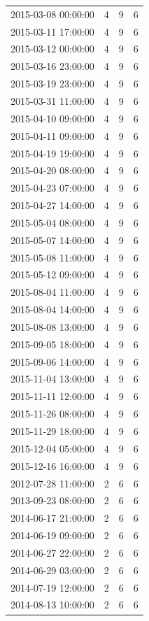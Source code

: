 \begin{tabular}{lrrr}
2015-03-08 00:00:00 & 4 & 9 & 6 \\
2015-03-11 17:00:00 & 4 & 9 & 6 \\
2015-03-12 00:00:00 & 4 & 9 & 6 \\
2015-03-16 23:00:00 & 4 & 9 & 6 \\
2015-03-19 23:00:00 & 4 & 9 & 6 \\
2015-03-31 11:00:00 & 4 & 9 & 6 \\
2015-04-10 09:00:00 & 4 & 9 & 6 \\
2015-04-11 09:00:00 & 4 & 9 & 6 \\
2015-04-19 19:00:00 & 4 & 9 & 6 \\
2015-04-20 08:00:00 & 4 & 9 & 6 \\
2015-04-23 07:00:00 & 4 & 9 & 6 \\
2015-04-27 14:00:00 & 4 & 9 & 6 \\
2015-05-04 08:00:00 & 4 & 9 & 6 \\
2015-05-07 14:00:00 & 4 & 9 & 6 \\
2015-05-08 11:00:00 & 4 & 9 & 6 \\
2015-05-12 09:00:00 & 4 & 9 & 6 \\
2015-08-04 11:00:00 & 4 & 9 & 6 \\
2015-08-04 14:00:00 & 4 & 9 & 6 \\
2015-08-08 13:00:00 & 4 & 9 & 6 \\
2015-09-05 18:00:00 & 4 & 9 & 6 \\
2015-09-06 14:00:00 & 4 & 9 & 6 \\
2015-11-04 13:00:00 & 4 & 9 & 6 \\
2015-11-11 12:00:00 & 4 & 9 & 6 \\
2015-11-26 08:00:00 & 4 & 9 & 6 \\
2015-11-29 18:00:00 & 4 & 9 & 6 \\
2015-12-04 05:00:00 & 4 & 9 & 6 \\
2015-12-16 16:00:00 & 4 & 9 & 6 \\
2012-07-28 11:00:00 & 2 & 6 & 6 \\
2013-09-23 08:00:00 & 2 & 6 & 6 \\
2014-06-17 21:00:00 & 2 & 6 & 6 \\
2014-06-19 09:00:00 & 2 & 6 & 6 \\
2014-06-27 22:00:00 & 2 & 6 & 6 \\
2014-06-29 03:00:00 & 2 & 6 & 6 \\
2014-07-19 12:00:00 & 2 & 6 & 6 \\
2014-08-13 10:00:00 & 2 & 6 & 6 \\

\end{tabular}
